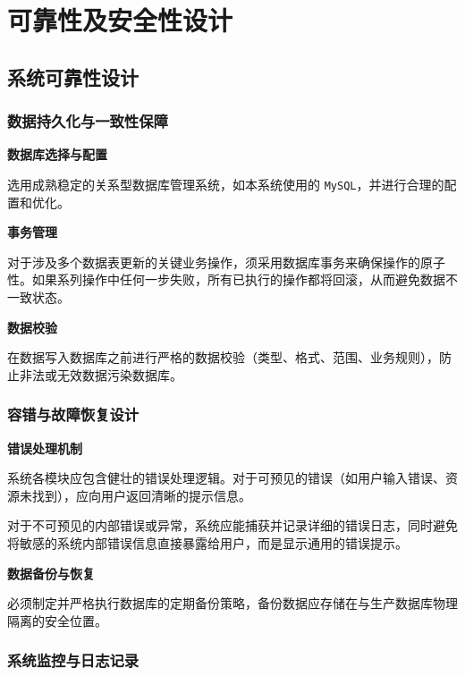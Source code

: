 \documentclass[12pt,a4paper,UTF8]{article}
\begin{document}
\section{可靠性及安全性设计}

\subsection{系统可靠性设计}

\subsubsection{数据持久化与一致性保障}

\noindent\textbf{数据库选择与配置}

选用成熟稳定的关系型数据库管理系统，如本系统使用的 \verb|MySQL|，并进行合理的配置和优化。

\vspace{0.25cm}

\noindent\textbf{事务管理}

对于涉及多个数据表更新的关键业务操作，须采用数据库事务来确保操作的原子性。如果系列操作中任何一步失败，所有已执行的操作都将回滚，从而避免数据不一致状态。

\vspace{0.25cm}

\noindent\textbf{数据校验}

在数据写入数据库之前进行严格的数据校验（类型、格式、范围、业务规则），防止非法或无效数据污染数据库。

\subsubsection{容错与故障恢复设计}

\noindent\textbf{错误处理机制}

系统各模块应包含健壮的错误处理逻辑。对于可预见的错误（如用户输入错误、资源未找到），应向用户返回清晰的提示信息。

对于不可预见的内部错误或异常，系统应能捕获并记录详细的错误日志，同时避免将敏感的系统内部错误信息直接暴露给用户，而是显示通用的错误提示。

\vspace{0.25cm}

\noindent\textbf{数据备份与恢复}

必须制定并严格执行数据库的定期备份策略，备份数据应存储在与生产数据库物理隔离的安全位置。

\subsubsection{系统监控与日志记录}
\end{document}
